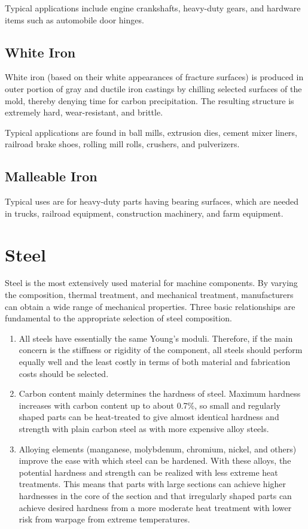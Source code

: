 \documentclass[a4paper,openany,12pt]{book}
\begin{document}
Typical applications include engine crankshafts, heavy-duty gears, and
hardware items such as automobile door hinges.

\subsection{White Iron}
\label{white-iron}
White iron (based on their white appearances of fracture surfaces) is
produced in outer portion of gray and ductile iron castings by chilling
selected surfaces of the mold, thereby denying time for carbon
precipitation. The resulting structure is extremely hard,
wear-resistant, and brittle.

Typical applications are found in ball mills, extrusion dies, cement
mixer liners, railroad brake shoes, rolling mill rolls, crushers, and
pulverizers.

\subsection{Malleable Iron}
\label{malleable-iron}
Typical uses are for heavy-duty parts having bearing surfaces, which are
needed in trucks, railroad equipment, construction machinery, and farm
equipment.

\section{Steel}
\label{steel}
Steel is the most extensively used material for machine components. By
varying the composition, thermal treatment, and mechanical treatment,
manufacturers can obtain a wide range of mechanical properties. Three
basic relationships are fundamental to the appropriate selection of
steel composition.

\begin{enumerate}
\item All steels have essentially the same Young's moduli. Therefore, if
the main concern is the stiffness or rigidity of the component, all
steels should perform equally well and the least costly in terms of
both material and fabrication costs should be selected.

\item Carbon content mainly determines the hardness of steel. Maximum
hardness increases with carbon content up to about 0.7\%, so small and
regularly shaped parts can be heat-treated to give almost identical
hardness and strength with plain carbon steel as with more expensive
alloy steels.

\item Alloying elements (manganese, molybdenum, chromium, nickel, and
others) improve the ease with which steel can be hardened. With these
alloys, the potential hardness and strength can be realized with less
extreme heat treatments. This means that parts with large sections
can achieve higher hardnesses in the core of the section and that
irregularly shaped parts can achieve desired hardness from a more
moderate heat treatment with lower risk from warpage from extreme
temperatures.
\end{enumerate}
\end{document}
